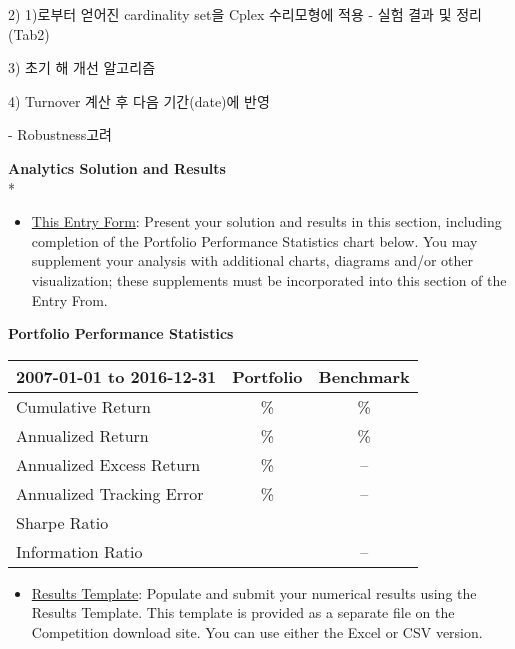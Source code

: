 \documentclass[11pt]{article}
\begin{document}
		
	2) 1)로부터 얻어진 cardinality set을 Cplex 수리모형에 적용 
	    - 실험 결과 및 정리 (Tab2)
	    
	3) 초기 해 개선 알고리즘
	
	4) Turnover 계산 후 다음 기간(date)에 반영


- Robustness고려



\textbf{Analytics Solution and Results}\\*




\begin{itemize}
\item \underline {This Entry Form}: Present your solution and results in this section, including completion of the Portfolio Performance Statistics chart below. You may supplement your analysis with additional charts, diagrams and/or other visualization; these supplements must be incorporated into this section of the Entry From.
\end{itemize}

\begin{center}
\textbf{Portfolio Performance Statistics}\vspace*{-14pt}
\end{center}
\begin{table}[htbp]
\def\arraystretch{1.4}
\begin{center}
\begin{tabular}{|l|c|c|}
\hline
\textbf{2007-01-01 to 2016-12-31}& 
\textbf{Portfolio}& 
\textbf{Benchmark} \\
\hline
Cumulative Return& 
{\%}& 
{\%} \\
\hline
Annualized Return& 
{\%}& 
{\%} \\
\hline
Annualized Excess Return& 
{\%}& 
-- \\
\hline
Annualized Tracking Error& 
{\%}& 
-- \\
\hline
Sharpe Ratio& 
& 
 \\
\hline
Information Ratio& 
& 
-- \\
\hline
\end{tabular}
\label{tab1}
\end{center}
\end{table}

\begin{itemize}
\item \underline {Results Template}: Populate and submit your numerical results using the Results Template. This template is provided as a separate file on the Competition download site. You can use either the Excel or CSV version.
\end{itemize}
\end{document}
